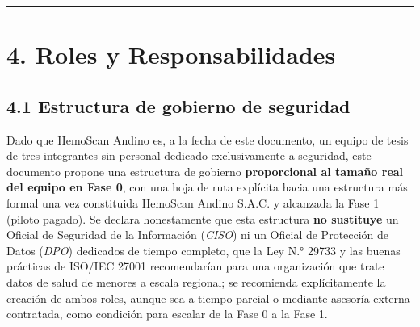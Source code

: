 \documentclass[11pt,a4paper]{article}
\begin{document}
\begin{center}\rule{0.5\linewidth}{0.5pt}\end{center}

\section{4. Roles y Responsabilidades}\label{roles-y-responsabilidades}

\subsection{4.1 Estructura de gobierno de seguridad}\label{estructura-de-gobierno-de-seguridad}

Dado que HemoScan Andino es, a la fecha de este documento, un equipo de tesis de tres integrantes sin personal dedicado exclusivamente a seguridad, este documento propone una estructura de gobierno \textbf{proporcional al tamaño real del equipo en Fase 0}, con una hoja de ruta explícita hacia una estructura más formal una vez constituida HemoScan Andino S.A.C. y alcanzada la Fase 1 (piloto pagado). Se declara honestamente que esta estructura \textbf{no sustituye} un Oficial de Seguridad de la Información (\emph{CISO}) ni un Oficial de Protección de Datos (\emph{DPO}) dedicados de tiempo completo, que la Ley N.° 29733 y las buenas prácticas de ISO/IEC 27001 recomendarían para una organización que trate datos de salud de menores a escala regional; se recomienda explícitamente la creación de ambos roles, aunque sea a tiempo parcial o mediante asesoría externa contratada, como condición para escalar de la Fase 0 a la Fase 1.
\end{document}
